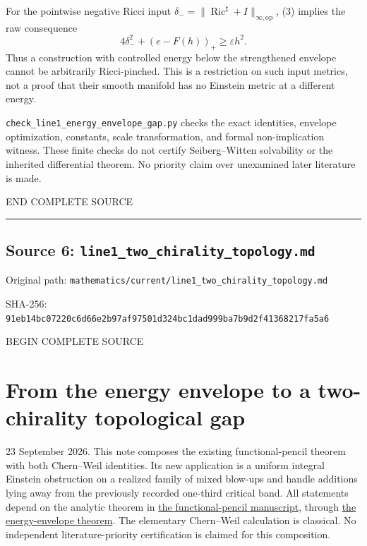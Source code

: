 \documentclass[
  10pt,
]{article}
\begin{document}
For the pointwise negative Ricci input
\(\delta_-=\|\operatorname{Ric}^{\sharp}+I\|_{\infty,\mathrm{op}}\), (3)
implies the raw consequence \[
 4\delta_-^2+(e-F(h))_+\ge\varepsilon h^2.
 \tag{18}
\] Thus a construction with controlled energy below the strengthened
envelope cannot be arbitrarily Ricci-pinched. This is a restriction on
such input metrics, not a proof that their smooth manifold has no
Einstein metric at a different energy.

\nolinkurl{check_line1_energy_envelope_gap.py} checks the exact
identities, envelope optimization, constants, scale transformation, and
formal non-implication witness. These finite checks do not certify
Seiberg--Witten solvability or the inherited differential theorem. No
priority claim over unexamined later literature is made.

END COMPLETE SOURCE

\begin{center}\rule{0.5\linewidth}{0.5pt}\end{center}

\hypertarget{source-6-line1_two_chirality_topology.md}{%
\subsection{Source 6:
\nolinkurl{line1_two_chirality_topology.md}}\label{source-6-line1_two_chirality_topology.md}}

Original path:
\nolinkurl{mathematics/current/line1_two_chirality_topology.md}

SHA-256:
\nolinkurl{91eb14bc07220c6d66e2b97af97501d324bc1dad999ba7b9d2f41368217fa5a6}

BEGIN COMPLETE SOURCE

\hypertarget{from-the-energy-envelope-to-a-two-chirality-topological-gap}{%
\section{From the energy envelope to a two-chirality topological
gap}\label{from-the-energy-envelope-to-a-two-chirality-topological-gap}}

23 September 2026. This note composes the existing functional-pencil
theorem with both Chern--Weil identities. Its new application is a
uniform integral Einstein obstruction on a realized family of mixed
blow-ups and handle additions lying away from the previously recorded
one-third critical band. All statements depend on the analytic theorem
in \href{line1_functional_pencil.md}{the functional-pencil manuscript},
through \href{line1_energy_envelope_gap.md}{the energy-envelope
theorem}. The elementary Chern--Weil calculation is classical. No
independent literature-priority certification is claimed for this
composition.
\end{document}
